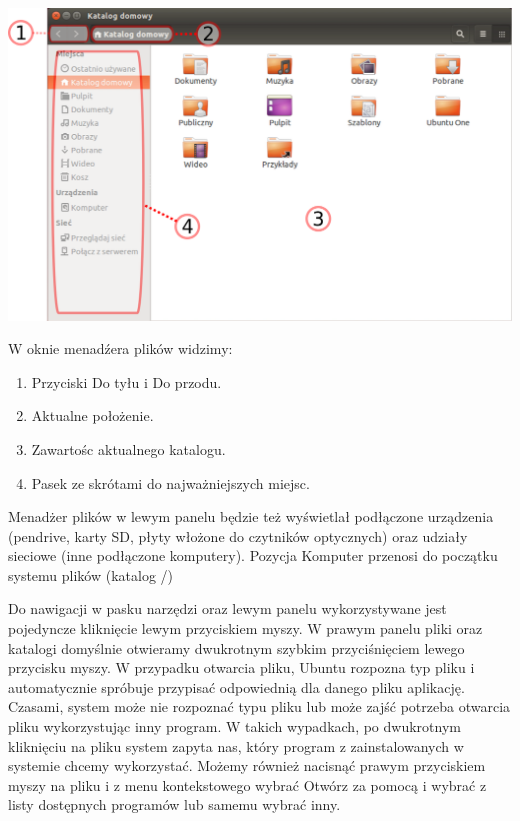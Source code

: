\begin{center}
	\includegraphics[width=\linewidth]{images/programy_nautilus.png}
\end{center}

W oknie menadźera plików widzimy:
\begin{enumerate}[label=\protect\circled{\arabic*}]
\item Przyciski \textcolor{ubuntu_orange}{Do tyłu} i \textcolor{ubuntu_orange}{Do przodu}.
\item Aktualne położenie.
\item Zawartośc aktualnego katalogu.
\item Pasek ze skrótami do najważniejszych miejsc.
\end{enumerate}

Menadżer plików w lewym panelu będzie też wyświetlał podłączone urządzenia (pendrive, karty SD, płyty włożone do czytników optycznych) oraz udziały sieciowe (inne podłączone komputery). Pozycja \textcolor{ubuntu_orange}{Komputer} przenosi do początku systemu plików (katalog /)

Do nawigacji w pasku narzędzi oraz lewym panelu wykorzystywane jest pojedyncze kliknięcie lewym przyciskiem myszy. W prawym panelu pliki oraz katalogi domyślnie otwieramy dwukrotnym szybkim przyciśnięciem lewego przycisku myszy. W przypadku otwarcia pliku, Ubuntu rozpozna typ pliku i automatycznie spróbuje przypisać odpowiednią dla danego pliku aplikację. Czasami, system może nie rozpoznać typu pliku lub może zajść potrzeba otwarcia pliku wykorzystując inny program. W takich wypadkach, po dwukrotnym kliknięciu na pliku system zapyta nas, który program z zainstalowanych w systemie chcemy wykorzystać. Możemy również nacisnąć prawym przyciskiem myszy na pliku i z menu kontekstowego wybrać Otwórz za pomocą i wybrać z listy dostępnych programów lub samemu wybrać inny.

